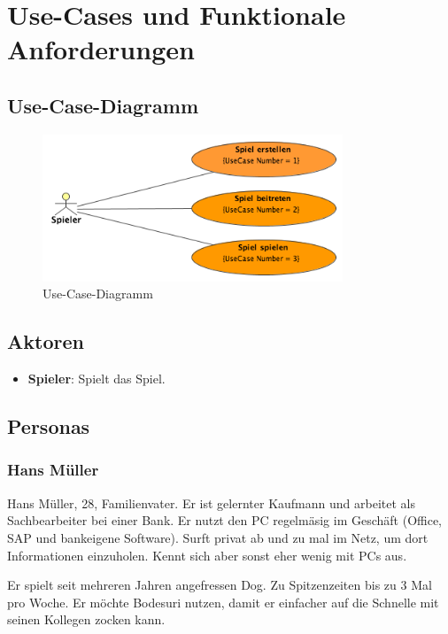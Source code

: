 \documentclass[a4paper,12pt,halfparskip,DIV14]{scrartcl}
\begin{document}


\section{Use-Cases und Funktionale Anforderungen} 
\subsection{Use-Case-Diagramm}\label{sub:use_case_diagramm} 
\begin{figure}
	[htp] \centering 
	\includegraphics[width=0.8\textwidth]{UseCaseDiagramm.png} \caption{Use-Case-Diagramm}\label{fig:UseCaseDiagramm.png} 
\end{figure}

\subsection{Aktoren}\label{sec:aktoren} 
\begin{itemize}
	\item \textbf{Spieler}: Spielt das Spiel. 
\end{itemize}

\subsection{Personas}\label{sec:personas} 

\subsubsection{Hans Müller}\label{sub:hans_müller} 

Hans Müller, 28, Familienvater. Er ist gelernter Kaufmann und arbeitet als Sachbearbeiter bei einer Bank. Er nutzt den PC regelmäsig im Geschäft (Office, SAP und bankeigene Software). Surft privat ab und zu mal im Netz, um dort Informationen einzuholen. Kennt sich aber sonst eher wenig mit PCs aus. 

Er spielt seit mehreren Jahren angefressen Dog. Zu Spitzenzeiten bis zu 3 Mal pro Woche. Er möchte Bodesuri nutzen, damit er einfacher auf die Schnelle mit seinen Kollegen zocken kann. 
\end{document}
